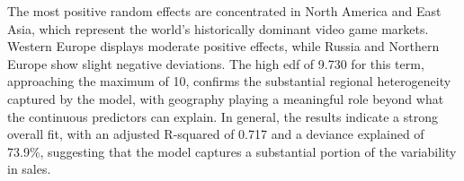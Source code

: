 The most positive random effects are concentrated in North America and East Asia, which represent the world's historically dominant video game markets. Western Europe displays moderate positive effects, while Russia and Northern Europe show slight negative deviations.
The high edf of 9.730 for this term, approaching the maximum of 10, confirms the substantial regional heterogeneity captured by the model, with geography playing a meaningful role beyond what the continuous predictors can explain.
In general, the results indicate a strong overall fit, with an adjusted 
R-squared of 0.717 and a deviance explained of 73.9\%, 
suggesting that the model captures a substantial portion of the 
variability in sales.